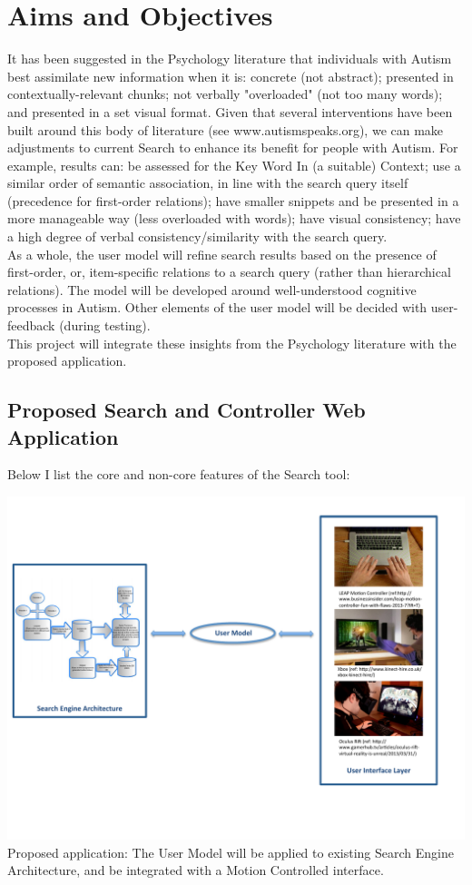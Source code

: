 \documentclass[10pt]{article}
\begin{document}
\section{Aims and Objectives} 
It has been suggested in the Psychology literature that individuals with Autism best assimilate new information when it is: concrete (not abstract); presented in contextually-relevant chunks; not verbally "overloaded" (not too many words); and presented in a set visual format. Given that several interventions have been built around this body of literature (see www.autismspeaks.org), we can make adjustments to current Search to enhance its benefit for people with Autism. For example, results can: be assessed for the Key Word In (a suitable) Context; use a similar order of semantic association, in line with the search query itself (precedence for first-order relations); have smaller snippets and be presented in a more manageable way (less overloaded with words); have visual consistency; have a high degree of verbal consistency/similarity with the search query.
\\As a whole, the user model will refine search results based on the presence of first-order, or, item-specific relations to a search query (rather than hierarchical relations). The model will be developed around well-understood cognitive processes in Autism. Other elements of the user model will be decided with user-feedback (during testing). 
\\This project will integrate these insights from the Psychology literature with the proposed application.

\subsection{Proposed Search and Controller Web Application}\label{proposed}
Below I list the core and non-core features of the Search tool:

\begin{center}
\includegraphics[scale=0.7]{searchEngArchi}
Proposed application: The User Model will be applied to existing Search Engine Architecture\cite{seimage}, and be integrated with a Motion Controlled interface.
\end{center}
\end{document}
